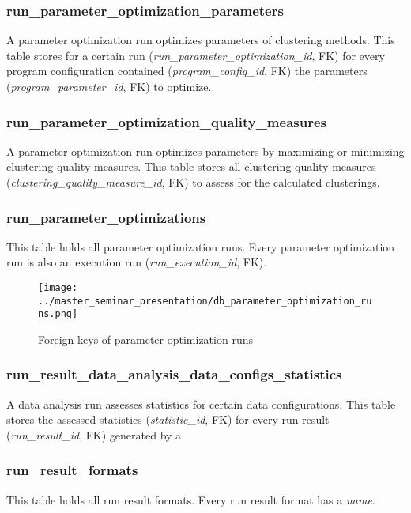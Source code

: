 	\subsubsection{run\_parameter\_optimization\_parameters}
	A parameter optimization run optimizes parameters of clustering methods. This table stores for a certain run (\textit{run\_parameter\_optimization\_id}, FK) for every program configuration contained (\textit{program\_config\_id}, FK) the parameters (\textit{program\_parameter\_id}, FK) to optimize.
	
	\subsubsection{run\_parameter\_optimization\_quality\_measures}
	A parameter optimization run optimizes parameters by maximizing or minimizing clustering quality measures. This table stores all clustering quality measures (\textit{clustering\_quality\_measure\_id}, FK) to assess for the calculated clusterings.
	
	\subsubsection{run\_parameter\_optimizations}
	This table holds all parameter optimization runs. Every parameter optimization run is also an execution run (\textit{run\_execution\_id}, FK).

\begin{figure}[hbtp]
\caption{Foreign keys of parameter optimization runs}
\label{fig_parameter_optimization_runs_foreign_keys}
\centering
\texttt{[image: ../master\_seminar\_presentation/db\_parameter\_optimization\_runs.png]}
\end{figure} 
	
	\subsubsection{run\_result\_data\_analysis\_data\_configs\_statistics}
	A data analysis run assesses statistics for certain data configurations. This table stores the assessed statistics (\textit{statistic\_id}, FK) for every run result (\textit{run\_result\_id}, FK) generated by a 
	
	\subsubsection{run\_result\_formats}
	This table holds all run result formats. Every run result format has a \textit{name}.
	
